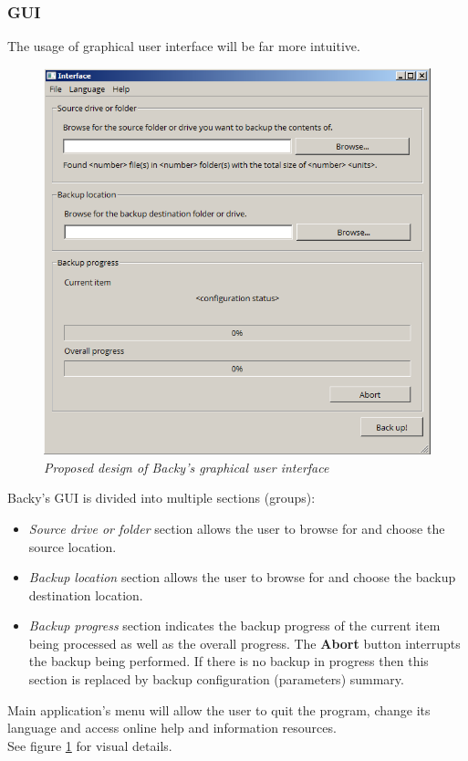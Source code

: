 \documentclass[a4paper]{article}
\begin{document}
      \subsubsection{GUI}
        The usage of graphical user interface will be far more intuitive.
        \begin{figure}[!ht]
         \centering
         \includegraphics[scale=0.7]{interface.png}
         \caption{\textit{Proposed design of Backy's graphical user interface}}
         \label{fig:interface}
        \end{figure}
        \par
        Backy's GUI is divided into multiple sections (groups):
        \begin{itemize}
          \item \textit{Source drive or folder} section allows the user to browse for and choose the source location.
          \item \textit{Backup location} section allows the user to browse for and choose the backup destination location.
          \item \textit{Backup progress} section indicates the backup progress of the current item being processed as well as the overall progress. The \textbf{Abort} button interrupts the backup being performed. If there is no backup in progress then this section is replaced by backup configuration (parameters) summary.
        \end{itemize}
        Main application's menu will allow the user to quit the program, change its language and access online help and information resources. \\
        \indent See figure \ref{fig:interface} for visual details.
\end{document}
